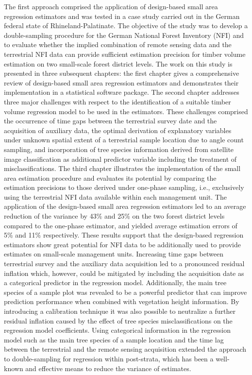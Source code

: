 The first approach comprised the application of design-based small area regression estimators and was tested in a case study carried out in the German federal state of Rhineland-Palatinate. The objective of the study was to develop a double-sampling procedure for the German National Forest Inventory (NFI) and to evaluate whether the implied combination of remote sensing data and the terrestrial NFI data can provide sufficient estimation precision for timber volume estimation on two small-scale forest district levels. The work on this study is presented in three subsequent chapters: the first chapter gives a comprehensive review of design-based small area regression estimators and demonstrates their implementation in a statistical software package. The second chapter addresses three major challenges with respect to the identification of a suitable timber volume regression model to be used in the estimators. These challenges comprised the occurrence of time gaps between the terrestrial survey date and the acquisition of auxiliary data, the optimal derivation of explanatory variables under unknown spatial extent of a terrestrial sample location due to angle count sampling, and incorporation of tree species information derived from satellite image classification as additional predictor variable including the treatment of misclassifications. The third chapter illustrates the implementation of the small area estimation procedure and evaluates its potential by comparing the estimation precisions to those derived under one-phase sampling, i.e., exclusively using the terrestrial NFI data available within each management unit. The application of the design-based small area regression estimators led to an average reduction of the variance by 43\% and 25\% on the two forest district levels compared to the one-phase estimator, and yielded average estimation errors of 5\% and 11\% respectively. These results support that the design-based regression estimators show great potential for NFI data to be additionally used to provide estimates on small-scale management units. Increasing time gaps between terrestrial survey and the auxiliary data acquisition led to a pronounced residual inflation which, however, could be mitigated by including the acquisition date as a categorical predictor in the regression model. Additionally, the main tree species of a sample plot was revealed to be a powerful predictor that can improve prediction performance when combined with vegetation height information. By introducing a calibration technique it was also possible to neutralize a further residual inflation caused by the effect of tree species misclassifications on the regression model coefficients. Using categorical information in the regression model such as the main tree species of a sample location and the time lag between the terrestrial and the remote sensing acquisition extended the approach to double-sampling for regression within post-strata, which has been a well-known and effective means to reduce the variance of estimates.\par

